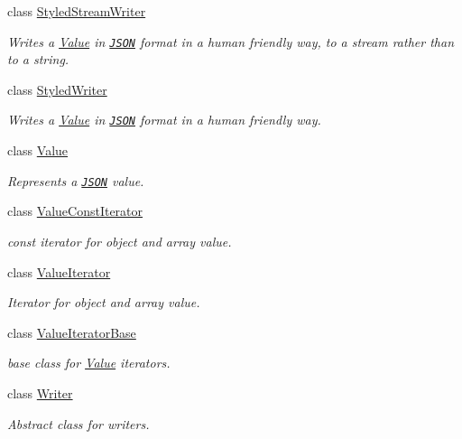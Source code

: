 \begin{DoxyCompactItemize}
class \hyperlink{class_json_1_1_styled_stream_writer}{Styled\+Stream\+Writer}
\begin{DoxyCompactList}\small\item\em Writes a \hyperlink{class_json_1_1_value}{Value} in \href{http://www.json.org}{\tt J\+S\+ON} format in a human friendly way, to a stream rather than to a string. \end{DoxyCompactList}\item 
class \hyperlink{class_json_1_1_styled_writer}{Styled\+Writer}
\begin{DoxyCompactList}\small\item\em Writes a \hyperlink{class_json_1_1_value}{Value} in \href{http://www.json.org}{\tt J\+S\+ON} format in a human friendly way. \end{DoxyCompactList}\item 
class \hyperlink{class_json_1_1_value}{Value}
\begin{DoxyCompactList}\small\item\em Represents a \href{http://www.json.org}{\tt J\+S\+ON} value. \end{DoxyCompactList}\item 
class \hyperlink{class_json_1_1_value_const_iterator}{Value\+Const\+Iterator}
\begin{DoxyCompactList}\small\item\em const iterator for object and array value. \end{DoxyCompactList}\item 
class \hyperlink{class_json_1_1_value_iterator}{Value\+Iterator}
\begin{DoxyCompactList}\small\item\em Iterator for object and array value. \end{DoxyCompactList}\item 
class \hyperlink{class_json_1_1_value_iterator_base}{Value\+Iterator\+Base}
\begin{DoxyCompactList}\small\item\em base class for \hyperlink{class_json_1_1_value}{Value} iterators. \end{DoxyCompactList}\item 
class \hyperlink{class_json_1_1_writer}{Writer}
\begin{DoxyCompactList}\small\item\em Abstract class for writers. \end{DoxyCompactList}\end{DoxyCompactItemize}
